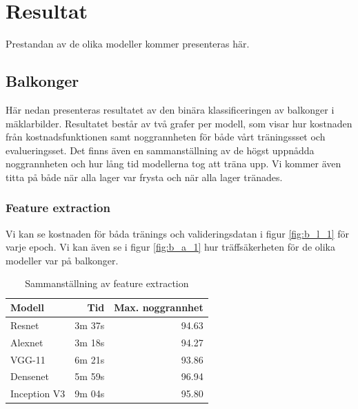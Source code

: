 \documentclass[]{kththesis}
\begin{document}
\chapter{Resultat}
Prestandan av de olika modeller kommer presenteras här.

\section{Balkonger}
Här nedan presenteras resultatet av den binära klassificeringen av balkonger i mäklarbilder. Resultatet består av två grafer per modell, som visar hur kostnaden från kostnadsfunktionen samt noggrannheten för både vårt träningssset och evalueringsset. Det finns även en sammanställning av de högst uppnådda noggrannheten och hur lång tid modellerna tog att träna upp. Vi kommer även titta på både när alla lager var frysta och när alla lager tränades.

\subsection{Feature extraction}
Vi kan se kostnaden för båda tränings och valideringsdatan i figur \ref{fig:b_l_1} för varje epoch. Vi kan även se i figur \ref{fig:b_a_1} hur träffsäkerheten för de olika modeller var på balkonger.

\begin{table}
  \centering
  \begin{tabular}{|l|r|r|}
    Modell & Tid & Max. noggrannhet \\ 
    \hline
    Resnet       & 3m 37s & 94.63 \\
    Alexnet      & 3m 18s & 94.27 \\
    VGG-11       & 6m 21s & 93.86 \\
    Densenet     & 5m 59s & 96.94 \\
    Inception V3 & 9m 04s & 95.80 \\
  \end{tabular}
  \caption{Sammanställning av feature extraction}
\end{table}
\end{document}
